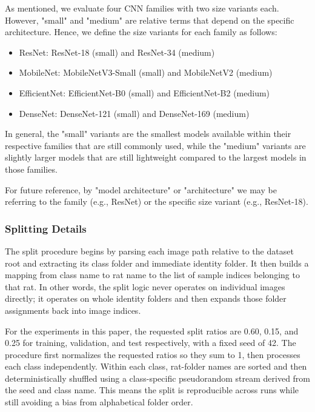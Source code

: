 \documentclass[conference]{IEEEtran}
\begin{document}
As mentioned, we evaluate four CNN families with two size variants each. However, "small" and "medium" are relative terms that depend on the specific architecture. Hence, we define the size variants for each family as follows:

\begin{itemize}
    \item ResNet: ResNet-18 (small) and ResNet-34 (medium)
    \item MobileNet: MobileNetV3-Small (small) and MobileNetV2 (medium)
    \item EfficientNet: EfficientNet-B0 (small) and EfficientNet-B2 (medium)
    \item DenseNet: DenseNet-121 (small) and DenseNet-169 (medium)
\end{itemize}


In general, the "small" variants are the smallest models available within their respective families that are still commonly used, while the "medium" variants are slightly larger models that are still lightweight compared to the largest models in those families.

For future reference, by "model architecture" or "architecture" we may be referring to the family (e.g., ResNet) or the specific size variant (e.g., ResNet-18).

\subsubsection{Splitting Details}

The split procedure begins by parsing each image path relative to the dataset root and extracting its class folder and immediate identity folder. It then builds a mapping from class name to rat name to the list of sample indices belonging to that rat. In other words, the split logic never operates on individual images directly; it operates on whole identity folders and then expands those folder assignments back into image indices.

For the experiments in this paper, the requested split ratios are 0.60, 0.15, and 0.25 for training, validation, and test respectively, with a fixed seed of 42. The procedure first normalizes the requested ratios so they sum to 1, then processes each class independently. Within each class, rat-folder names are sorted and then deterministically shuffled using a class-specific pseudorandom stream derived from the seed and class name. This means the split is reproducible across runs while still avoiding a bias from alphabetical folder order.
\end{document}
